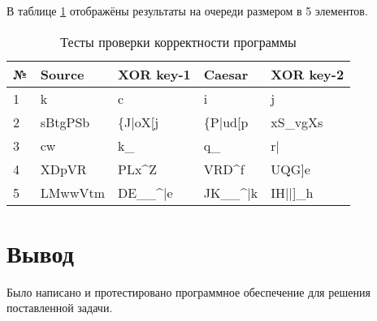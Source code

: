         В таблице \ref{table:testing} отображёны результаты на очереди размером в 5 элементов.

        \begin{table}[h!]
            \caption{Тесты проверки корректности программы}
            \centering
\begin{tabular}{|l|l|l|l|l|}
\hline
№ & Source  & XOR key-1                  & Caesar                     & XOR key-2  \\ \hline
1 & k       & c                          & i                          & j          \\ \hline
2 & sBtgPSb & \{J|oX{[}j                 & \{P|ud{[}p                 & xS\_vgXs   \\ \hline
3 & cw      & k\_                        & q\_                        & r|         \\ \hline
4 & XDpVR   & PLx\textasciicircum{}Z     & VRD\textasciicircum{}f     & UQG{]}e    \\ \hline
5 & LMwwVtm & DE\_\_\textasciicircum{}|e & JK\_\_\textasciicircum{}|k & IH||{]}\_h \\ \hline
\end{tabular}
            \label{table:testing}
        \end{table}

	\section*{Вывод}
	
	Было написано и протестировано программное обеспечение для решения поставленной задачи.
    	
\newpage